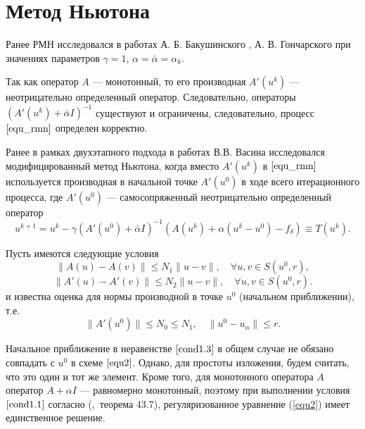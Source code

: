 \newpage
\section{Метод Ньютона}
Ранее РМН исследовался в работах А. Б. Бакушинского \cite{Bak1992}, А. В. Гончарского \cite{BakGon1989} при значениях параметров $\gamma=1$, $\alpha=\bar{\alpha}=\alpha_k$.

Так как оператор $A$ --- монотонный, то его производная $A'(u^k)$ --- неотрицательно определенный оператор. Следовательно, операторы $(A'(u^k)+\bar\alpha I)^{-1}$ существуют и ограничены, следовательно, процесс $\eqref{equ_rmn}$ определен корректно.

Ранее в рамках двухэтапного подхода в работах В.В. Васина \cite{VasAkiMin2013, Vasin2014} исследовался модифицированный метод Ньютона, когда вместо $A'(u^k)$ в $\eqref{equ_rmn}$ используется производная в начальной точке $A'(u^0)$ в ходе всего итерационного процесса, где $A'(u^0)$ --- самосопряженный неотрицательно определенный оператор  
$$
u^{k+1}=u^k-\gamma(A'(u^0)+\bar\alpha I)^{-1}(A(u^k)+\alpha(u^k-u^0)-f_\delta)\equiv{T(u^k)}.
$$

Пусть имеются следующие условия
\begin{equation}\label{cond1.1}
\|A(u)-A(v)\|\le N_1\|u-v\|, \quad \forall u, v \in S(u^0, r),
\end{equation}
\begin{equation}\label{cond1.2}
\|A'(u)-A'(v)\|\le N_2\|u-v\|, \quad \forall u, v \in S(u^0, r).
\end{equation}
и известна оценка для нормы производной в точке $u^0$ (начальном приближении), т.е.
\begin{equation}\label{cond1.3}
\|A'(u^0)\| \le N_0\le N_1, \quad \|u^0-u_\alpha\| \le r.
\end{equation}
\begin{remark}
	Начальное приближение в неравенстве $\eqref{cond1.3}$ в общем случае не обязано совпадать с $u^0$ в схеме $\eqref{equ2}$. Однако, для простоты изложения, будем считать, что это один и тот же элемент. Кроме того, для монотонного оператора $A$ оператор $A+\alpha I$ --- равномерно монотонный, поэтому при выполнении условия $\ref{cond1.1}$ согласно (\cite{KufFuch1988},~теорема 43.7), регуляризованное уравнение (\ref{equ2}) имеет единственное решение.
\end{remark}

